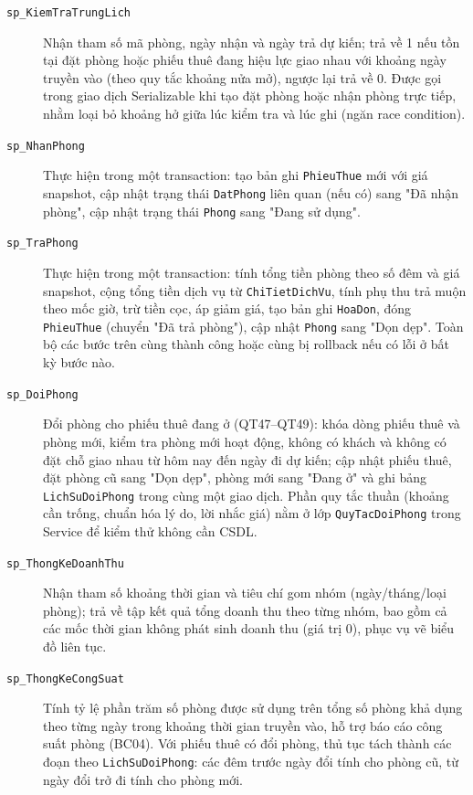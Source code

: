 \documentclass[14pt]{report}
\begin{document}
\begin{description}
  \item[\texttt{sp\_KiemTraTrungLich}] Nhận tham số mã phòng, ngày nhận và ngày trả dự kiến; trả về 1 nếu tồn tại đặt phòng hoặc phiếu thuê đang hiệu lực giao nhau với khoảng ngày truyền vào (theo quy tắc khoảng nửa mở), ngược lại trả về 0. Được gọi trong giao dịch Serializable khi tạo đặt phòng hoặc nhận phòng trực tiếp, nhằm loại bỏ khoảng hở giữa lúc kiểm tra và lúc ghi (ngăn race condition).
  \item[\texttt{sp\_NhanPhong}] Thực hiện trong một transaction: tạo bản ghi \texttt{PhieuThue} mới với giá snapshot, cập nhật trạng thái \texttt{DatPhong} liên quan (nếu có) sang "Đã nhận phòng", cập nhật trạng thái \texttt{Phong} sang "Đang sử dụng".
  \item[\texttt{sp\_TraPhong}] Thực hiện trong một transaction: tính tổng tiền phòng theo số đêm và giá snapshot, cộng tổng tiền dịch vụ từ \texttt{ChiTietDichVu}, tính phụ thu trả muộn theo mốc giờ, trừ tiền cọc, áp giảm giá, tạo bản ghi \texttt{HoaDon}, đóng \texttt{PhieuThue} (chuyển "Đã trả phòng"), cập nhật \texttt{Phong} sang "Dọn dẹp". Toàn bộ các bước trên cùng thành công hoặc cùng bị rollback nếu có lỗi ở bất kỳ bước nào.
  \item[\texttt{sp\_DoiPhong}] Đổi phòng cho phiếu thuê đang ở (QT47--QT49): khóa dòng phiếu thuê và phòng mới, kiểm tra phòng mới hoạt động, không có khách và không có đặt chỗ giao nhau từ hôm nay đến ngày đi dự kiến; cập nhật phiếu thuê, đặt phòng cũ sang "Dọn dẹp", phòng mới sang "Đang ở" và ghi bảng \texttt{LichSuDoiPhong} trong cùng một giao dịch. Phần quy tắc thuần (khoảng cần trống, chuẩn hóa lý do, lời nhắc giá) nằm ở lớp \texttt{QuyTacDoiPhong} trong Service để kiểm thử không cần CSDL.
  \item[\texttt{sp\_ThongKeDoanhThu}] Nhận tham số khoảng thời gian và tiêu chí gom nhóm (ngày/tháng/loại phòng); trả về tập kết quả tổng doanh thu theo từng nhóm, bao gồm cả các mốc thời gian không phát sinh doanh thu (giá trị 0), phục vụ vẽ biểu đồ liên tục.
  \item[\texttt{sp\_ThongKeCongSuat}] Tính tỷ lệ phần trăm số phòng được sử dụng trên tổng số phòng khả dụng theo từng ngày trong khoảng thời gian truyền vào, hỗ trợ báo cáo công suất phòng (BC04). Với phiếu thuê có đổi phòng, thủ tục tách thành các đoạn theo \texttt{LichSuDoiPhong}: các đêm trước ngày đổi tính cho phòng cũ, từ ngày đổi trở đi tính cho phòng mới.
\end{description}
\end{document}
